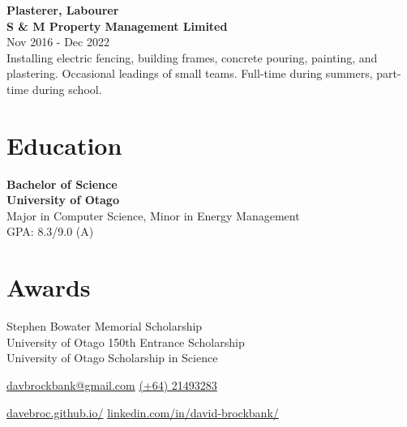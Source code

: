 \documentclass[lighthipster]{simplehipstercv}
\begin{document}
\begin{minipage}[t]{1\textwidth}
    \textbf{Plasterer, Labourer}\\
    \textbf{S \& M Property Management Limited }\\
    Nov 2016 - Dec 2022 \\
    Installing electric fencing, building frames, concrete pouring, painting, and plastering. Occasional leadings of small teams. Full-time during summers, part-time during school.\\
      
    \end{minipage}    
    \bigskip
    
    \begin{minipage}[t]{1\textwidth}
    \section*{Education}
    
    \textbf{Bachelor of Science}\\
    \textbf{University of Otago}\\
    Major in Computer Science, Minor in Energy Management\\
    GPA: 8.3/9.0 (A)\\
    
    \end{minipage}
    \bigskip
    
    \begin{minipage}[t]{1\textwidth}
    \section*{Awards}
    Stephen Bowater Memorial Scholarship\\
    University of Otago 150th Entrance Scholarship\\
    University of Otago Scholarship in Science
    \bigskip
    \bigskip
    
    \end{minipage}\hfill
\setlength{\parindent}{0pt}

\begin{minipage}[t]{1\textwidth}
\fontfamily{\sfdefault}\selectfont \color{black!70}
{\begin{center}\small 
    \href{mailto:davbrockbank@gmail.com}{ davbrockbank@gmail.com}  
    \href{tel:021493283}{ (+64) 21493283}  
 \end{center}
\begin{center}
    \href{https://davebroc.github.io/}{davebroc.github.io/}
    \href{https://www.linkedin.com/in/david-brockbank/}{linkedin.com/in/david-brockbank/}
\end{center}
}
\end{minipage}
\end{document}

